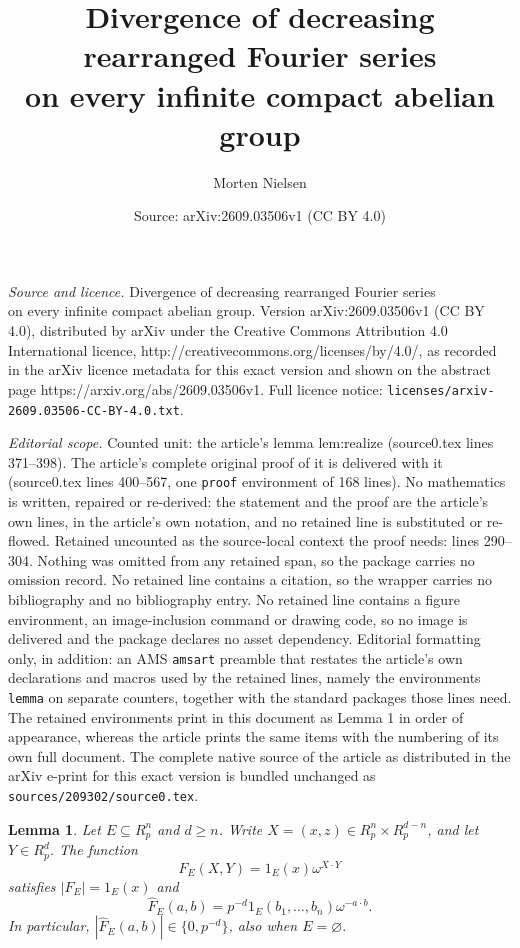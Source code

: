 \documentclass[10pt,a4paper]{amsart}
\title{Divergence of decreasing rearranged Fourier series\\ on every infinite compact abelian group}
\author{Morten Nielsen}
\date{Source: arXiv:2609.03506v1 (CC BY 4.0)}
\newtheorem{lemma}{Lemma}
\newcommand{\R}{R}
\begin{document}
\maketitle

\noindent\emph{Source and licence.} Divergence of decreasing rearranged Fourier series\\ on every infinite compact abelian group. Version arXiv:2609.03506v1 (CC BY 4.0), distributed by arXiv under the Creative Commons Attribution 4.0 International licence, http://creativecommons.org/licenses/by/4.0/, as recorded in the arXiv licence metadata for this exact version and shown on the abstract page https://arxiv.org/abs/2609.03506v1. Full licence notice: \texttt{licenses/arxiv-2609.03506-CC-BY-4.0.txt}.\par\smallskip

\noindent\textit{Editorial scope.} Counted unit: the article's lemma lem:realize (source0.tex lines 371--398). The article's complete original proof of it is delivered with it (source0.tex lines 400--567, one \texttt{proof} environment of 168 lines). No mathematics is written, repaired or re-derived: the statement and the proof are the article's own lines, in the article's own notation, and no retained line is substituted or re-flowed.  Retained uncounted as the source-local context the proof needs: lines 290--304.  Nothing was omitted from any retained span, so the package carries no omission record.  No retained line contains a citation, so the wrapper carries no bibliography and no bibliography entry.  No retained line contains a figure environment, an image-inclusion command or drawing code, so no image is delivered and the package declares no asset dependency.  Editorial formatting only, in addition: an AMS \texttt{amsart} preamble that restates the article's own declarations and macros used by the retained lines, namely the environments \texttt{lemma} on separate counters, together with the standard packages those lines need.  The retained environments print in this document as Lemma 1 in order of appearance, whereas the article prints the same items with the numbering of its own full document.  The complete native source of the article as distributed in the arXiv e-print for this exact version is bundled unchanged as \texttt{sources/209302/source0.tex}.
\begin{lemma}\label{lem:chirp}
Let \(E\subseteq\R_p^n\) and \(d\geq n\). Write
\(X=(x,z)\in\R_p^n\times\R_p^{d-n}\), and let \(Y\in\R_p^d\).
The function
\[
 F_E(X,Y)=1_E(x)\omega^{X\cdot Y}
\]
satisfies \(|F_E|=1_E(x)\) and
\begin{equation}
 \widehat F_E(a,b)=
 p^{-d}1_E(b_1,\ldots,b_n)\omega^{-a\cdot b}.
\end{equation}
In particular, \(|\widehat F_E(a,b)|\in\{0,p^{-d}\}\), also when
\(E=\varnothing\).
\end{lemma}
\end{document}
